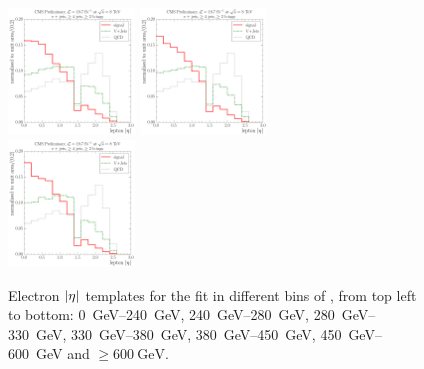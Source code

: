 \begin{figure}[!htbp]
  	{\includegraphics[width=0.3\textwidth]{measurement/HT/central/fit_templates/electron_templates_bin_380-450}}
  	{\includegraphics[width=0.3\textwidth]{measurement/HT/central/fit_templates/electron_templates_bin_450-600}}\\
  	{\includegraphics[width=0.3\textwidth]{measurement/HT/central/fit_templates/electron_templates_bin_600-inf}}
    \caption[Electron $\abs \eta$ templates for the fit in different bins of \HT]{Electron $\abs \eta$ templates for the
    fit in different bins of \HT, from top left to bottom: \SIrange{0}{240}{\GeV}, \SIrange{240}{280}{\GeV},
    \SIrange{280}{330}{\GeV}, \SIrange{330}{380}{\GeV}, \SIrange{380}{450}{\GeV}, \SIrange{450}{600}{\GeV} and $\geq
    \SI{600}{\GeV}$.}
    \label{fig:fit_tempaltes_HT_electron}
\end{figure}

